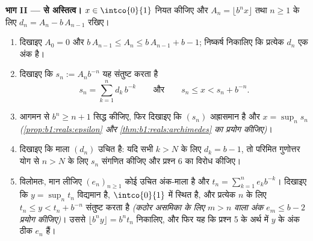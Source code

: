 \begin{problem}
\medskip \noindent\textbf{भाग II ---  से अस्तित्व।} $x \in
\intco{0}{1}$ नियत कीजिए और $A_n = \lfloor b^n x \rfloor$ तथा $n \geq 1$ के
लिए $d_n = A_n - b\,A_{n-1}$ रखिए।
\begin{enumerate}[resume]
  \item दिखाइए $A_0 = 0$ और $b\,A_{n-1} \leq A_n \leq b\,A_{n-1} + b - 1$;
  निष्कर्ष निकालिए कि प्रत्येक $d_n$ एक अंक है।
  \item दिखाइए कि $s_n := A_n b^{-n}$ यह संतुष्ट करता है
        \[
        s_n = \sum_{k=1}^{n} d_k\,b^{-k}
        \qquad\text{और}\qquad
        s_n \leq x < s_n + b^{-n} .
        \]
  \item आगमन से $b^n \geq n + 1$ सिद्ध कीजिए, फिर दिखाइए कि $(s_n)$
  अह्रासमान है और $x = \sup_n s_n$ \emph{(\cref{prop:b1:reals:epsilon} और
  \cref{thm:b1:reals:archimedes} का प्रयोग कीजिए)}।
  \item दिखाइए कि माला $(d_n)$ उचित है: यदि सभी $k > N$ के लिए $d_k = b -
  1$, तो परिमित गुणोत्तर योग से $n > N$ के लिए $s_n$ संगणित कीजिए और प्रश्न
  6 का विरोध कीजिए।
  \item विलोमतः, मान लीजिए $(e_n)_{n \geq 1}$ कोई उचित अंक-माला है और $t_n =
  \sum_{k=1}^n e_k b^{-k}$। दिखाइए कि $y = \sup_n t_n$ विद्यमान है,
  $\intco{0}{1}$ में स्थित है, और प्रत्येक $n$ के लिए $t_n \leq y < t_n +
  b^{-n}$ संतुष्ट करता है \emph{(कठोर असमिका के लिए $m > n$ वाला अंक $e_m
  \leq b - 2$ प्रयोग कीजिए)}। उससे $\lfloor b^n y \rfloor = b^n t_n$
  निकालिए, और फिर यह कि प्रश्न 5 के अर्थ में $y$ के अंक ठीक $e_n$ हैं।
\end{enumerate}


\end{problem}

